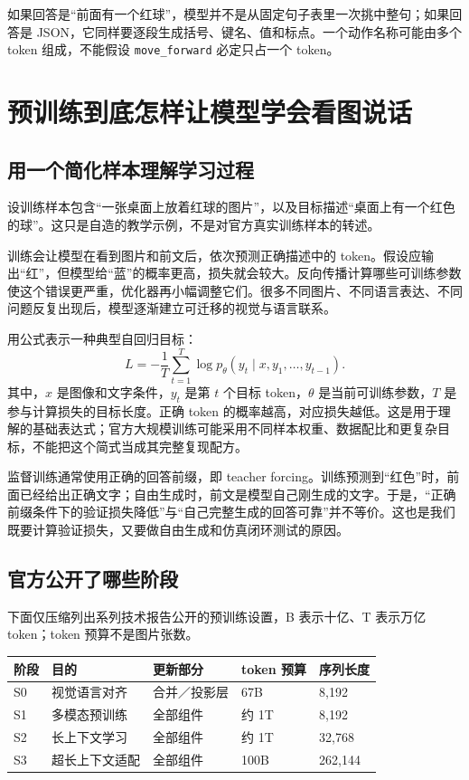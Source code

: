 如果回答是“前面有一个红球”，模型并不是从固定句子表里一次挑中整句；如果回答是 JSON，它同样要逐段生成括号、键名、值和标点。一个动作名称可能由多个 token 组成，不能假设 \texttt{move\_forward} 必定只占一个 token。

\section{预训练到底怎样让模型学会看图说话}

\subsection{用一个简化样本理解学习过程}

设训练样本包含“一张桌面上放着红球的图片”，以及目标描述“桌面上有一个红色的球”。这只是自造的教学示例，不是对官方真实训练样本的转述。

训练会让模型在看到图片和前文后，依次预测正确描述中的 token。假设应输出“红”，但模型给“蓝”的概率更高，损失就会较大。反向传播计算哪些可训练参数使这个错误更严重，优化器再小幅调整它们。很多不同图片、不同语言表达、不同问题反复出现后，模型逐渐建立可迁移的视觉与语言联系。

用公式表示一种典型自回归目标：
\[
  L=-\frac{1}{T}\sum_{t=1}^{T}\log p_{\theta}
  \left(y_t\mid x,y_1,\ldots,y_{t-1}\right).
\]
其中，$x$ 是图像和文字条件，$y_t$ 是第 $t$ 个目标 token，$\theta$ 是当前可训练参数，$T$ 是参与计算损失的目标长度。正确 token 的概率越高，对应损失越低。这是用于理解的基础表达式；官方大规模训练可能采用不同样本权重、数据配比和更复杂目标，不能把这个简式当成其完整复现配方。

监督训练通常使用正确的回答前缀，即 teacher forcing。训练预测到“红色”时，前面已经给出正确文字；自由生成时，前文是模型自己刚生成的文字。于是，“正确前缀条件下的验证损失降低”与“自己完整生成的回答可靠”并不等价。这也是我们既要计算验证损失，又要做自由生成和仿真闭环测试的原因。

\subsection{官方公开了哪些阶段}

下面仅压缩列出系列技术报告公开的预训练设置，B 表示十亿、T 表示万亿 token；token 预算不是图片张数。\cite{qwen-report}

\begin{longtable}{P{1.1cm}P{4.0cm}P{3.0cm}P{2.4cm}P{2.4cm}}
\textbf{阶段} & \textbf{目的} & \textbf{更新部分} & \textbf{token 预算} & \textbf{序列长度}\\
\hline
S0 & 视觉语言对齐 & 合并／投影层 & 67B & 8,192\\
S1 & 多模态预训练 & 全部组件 & 约 1T & 8,192\\
S2 & 长上下文学习 & 全部组件 & 约 1T & 32,768\\
S3 & 超长上下文适配 & 全部组件 & 100B & 262,144\\
\end{longtable}

